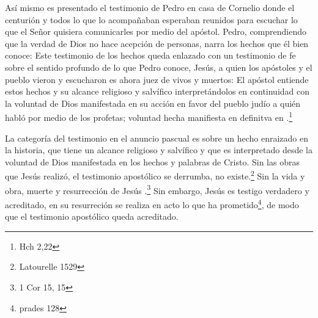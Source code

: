 Así mismo es presentado el testimonio de Pedro en casa de Cornelio donde el
centurión y todos lo que lo acompañaban esperaban reunidos para escuchar lo que
el Señor quisiera comunicarles por medio del apóstol. Pedro, comprendiendo que
la verdad de Dios no hace acepción de personas, narra los hechos que él bien
conoce:  Este testimonio de los hechos queda
enlazado con un testimonio de fe sobre el sentido profundo de lo que Pedro
conoce, Jesús, a quien los apóstoles y el pueblo vieron y escucharon es ahora
juez de vivos y muertos:  El apóstol
entiende estos hechos y su alcance religioso y salvífico interpretándolos en
continuidad con la voluntad de Dios manifestada en su acción en favor del pueblo
judío a quién habló por medio de los profetas; voluntad hecha manifiesta en
definitva en .\footnote{Hch 2,22}

La categoría del testimonio en el anuncio pascual es sobre un hecho enraizado en
la historia, que tiene un alcance religioso y salvífico y que es interpretado
desde la voluntad de Dios manifestada en los hechos y palabras de Cristo. Sin
las obras que Jesús realizó, el testimonio apostólico se derrumba, no
existe.\footnote{Latourelle 1529} Sin la vida y obra, muerte y resurrección de
Jesús .\footnote{1 Cor 15, 15} Sin embargo, Jesús es testigo verdadero y
acreditado, en su resurreción se realiza en acto lo que ha
prometido\footnote{prades 128}, de modo que el testimonio apostólico queda
acreditado.

